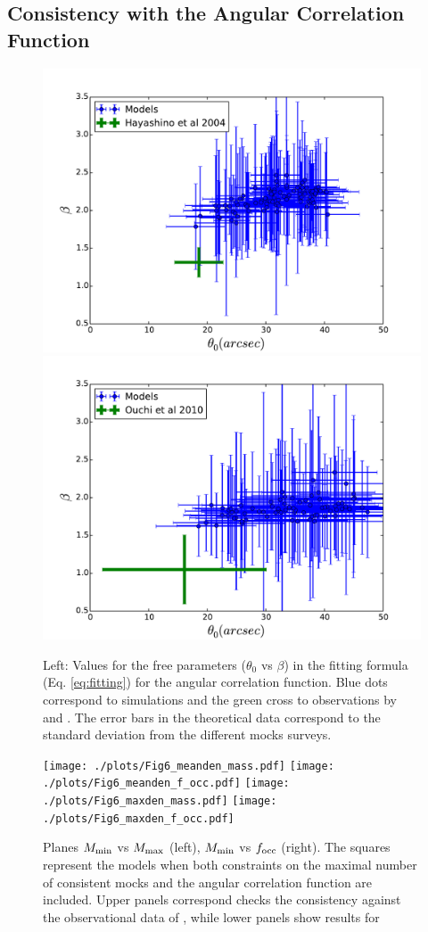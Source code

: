 \documentclass[usenatbib]{mn2e}
\begin{document}
\subsection{Consistency with the Angular Correlation Function}



\begin{figure}
\begin{center}
\includegraphics[width=0.46\linewidth,angle=0]{./plots/power_law_correlation_maxden.pdf} 
\hspace{5mm}  
\includegraphics[width=0.46\linewidth,angle=0]{./plots/power_law_correlation_meanden.pdf} 
\end{center}
\caption{Left: Values for the free parameters ($\theta_{0}$ vs $\beta$) 
in the fitting formula (Eq. \ref{eq:fitting}) for the angular
correlation function. Blue dots correspond to simulations and the
green cross to observations by \citet{Hayashino2004} and
\citet{Ouchi2010}. The error bars in the   theoretical data correspond
to the standard deviation from the different mocks surveys. 
\label{fig:correlation_parameters}}
\end{figure} 


\begin{figure}
\begin{center}
\texttt{[image: ./plots/Fig6\_meanden\_mass.pdf]}
\hspace{5mm}
\texttt{[image: ./plots/Fig6\_meanden\_f\_occ.pdf]}
\texttt{[image: ./plots/Fig6\_maxden\_mass.pdf]}
\hspace{5mm}
\texttt{[image: ./plots/Fig6\_maxden\_f\_occ.pdf]}
\end{center}
\caption{Planes $M_{\rm min}$ vs $M_{\rm max}$ (left), $M_{\rm min}$
  vs $f_{\rm occ}$ (right). The squares represent the models when both
   constraints on the maximal number of consistent mocks and the
  angular correlation function are included. Upper panels correspond
  checks the consistency against the observational data of
  \citet{Ouchi2010}, while lower panels show results for \citet{Hayashino2004}
  \label{fig:restriction_mock_and_f_occ_corr}} 
\end{figure} 
\end{document}
